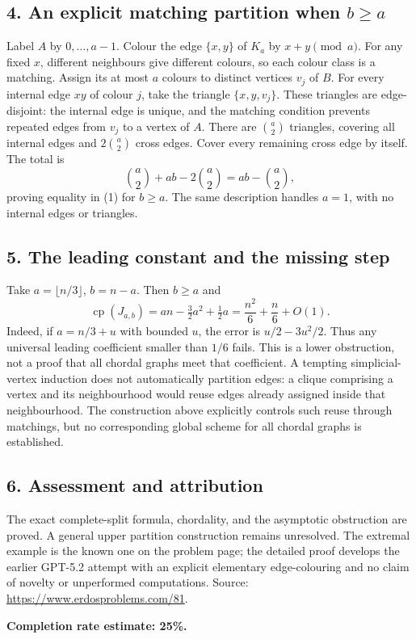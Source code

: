 \subsection*{4. An explicit matching partition when $b\ge a$}
Label $A$ by $0,\ldots,a-1$. Colour the edge $\{x,y\}$ of $K_a$ by $x+y\pmod a$. For any fixed $x$, different neighbours give different colours, so each colour class is a matching. Assign its at most $a$ colours to distinct vertices $v_j$ of $B$. For every internal edge $xy$ of colour $j$, take the triangle $\{x,y,v_j\}$. These triangles are edge-disjoint: the internal edge is unique, and the matching condition prevents repeated edges from $v_j$ to a vertex of $A$.
There are $\binom a2$ triangles, covering all internal edges and $2\binom a2$ cross edges. Cover every remaining cross edge by itself. The total is
\[
 \binom a2+ab-2\binom a2=ab-\binom a2,
\]
proving equality in (1) for $b\ge a$. The same description handles $a=1$, with no internal edges or triangles.

\subsection*{5. The leading constant and the missing step}
Take $a=\lfloor n/3\rfloor$, $b=n-a$. Then $b\ge a$ and
\[
 \operatorname{cp}(J_{a,b})=an-\tfrac32a^2+\tfrac12a
 =\frac{n^2}{6}+\frac n6+O(1).
\]
Indeed, if $a=n/3+u$ with bounded $u$, the error is $u/2-3u^2/2$. Thus any universal leading coefficient smaller than $1/6$ fails. This is a lower obstruction, not a proof that all chordal graphs meet that coefficient.
A tempting simplicial-vertex induction does not automatically partition edges: a clique comprising a vertex and its neighbourhood would reuse edges already assigned inside that neighbourhood. The construction above explicitly controls such reuse through matchings, but no corresponding global scheme for all chordal graphs is established.

\subsection*{6. Assessment and attribution}
The exact complete-split formula, chordality, and the asymptotic obstruction are proved. A general upper partition construction remains unresolved. The extremal example is the known one on the problem page; the detailed proof develops the earlier GPT-5.2 attempt with an explicit elementary edge-colouring and no claim of novelty or unperformed computations.
Source: \url{https://www.erdosproblems.com/81}.

\textbf{Completion rate estimate: 25\%.}
